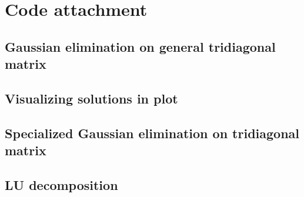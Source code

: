 \documentclass[norsk,a4paper,12pt]{article}
\begin{document}
\section{Code attachment}
\subsection{Gaussian elimination on general tridiagonal matrix}

\subsection{Visualizing solutions in plot}

\subsection{Specialized Gaussian elimination on tridiagonal matrix}

\subsection{LU decomposition}

\end{document}
